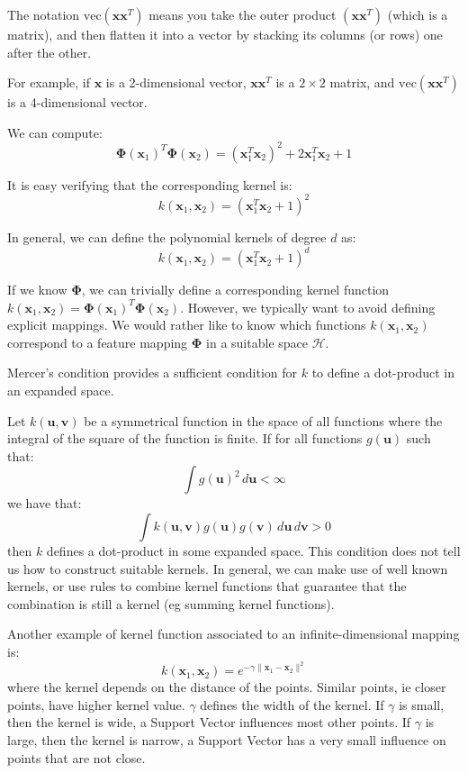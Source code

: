 The notation $\text{vec}(\mathbf{x}\mathbf{x}^T)$ means you take the outer product $(\mathbf{x}\mathbf{x}^T)$ (which is a matrix), and then
flatten it into a vector by stacking its columns (or rows) one after the other.

For example, if $\mathbf{x}$ is a 2-dimensional vector, $\mathbf{x}\mathbf{x}^T$ is a $2\times2$ matrix, and $\text{vec}(\mathbf{x}\mathbf{x}^T)$ is a
4-dimensional vector.

We can compute:
\[
\boldsymbol{\Phi}(\mathbf{x}_1)^T \boldsymbol{\Phi}(\mathbf{x}_2) = \left(\mathbf{x}_1^T \mathbf{x}_2\right)^2 + 2\mathbf{x}_1^T \mathbf{x}_2 + 1
\]

It is easy verifying that the corresponding kernel is:
\[
k(\mathbf{x}_1, \mathbf{x}_2) = \left(\mathbf{x}_1^T \mathbf{x}_2 + 1\right)^2
\]

In general, we can define the polynomial kernels of degree $d$ as:
\[
k(\mathbf{x}_1, \mathbf{x}_2) = \left(\mathbf{x}_1^T \mathbf{x}_2 + 1\right)^d
\]

If we know $\boldsymbol{\Phi}$, we can trivially define a corresponding kernel function $k(\mathbf{x}_1, \mathbf{x}_2) = \boldsymbol{\Phi}(\mathbf{x}_1)^T \boldsymbol{\Phi}(\mathbf{x}_2)$.
However, we typically want to avoid defining explicit mappings. We would rather like to
know which functions $k(\mathbf{x}_1, \mathbf{x}_2)$ correspond to a feature mapping $\boldsymbol{\Phi}$ in a suitable space
$\mathcal{H}$.

Mercer's condition provides a sufficient condition for $k$ to define a dot-product in an
expanded space.

Let $k(\mathbf{u}, \mathbf{v})$ be a symmetrical function in the space of all functions where the integral of the
square of the function is finite. If for all functions $g(\mathbf{u})$ such that:
\[
\int g(\mathbf{u})^2 \, d\mathbf{u} < \infty
\]
we have that:
\[
\int k(\mathbf{u}, \mathbf{v}) g(\mathbf{u}) g(\mathbf{v}) \, d\mathbf{u} \, d\mathbf{v} > 0
\]
then $k$ defines a dot-product in some expanded space. This condition does not tell us how
to construct suitable kernels. In general, we can make use of well known kernels, or use
rules to combine kernel functions that guarantee that the combination is still a kernel (eg
summing kernel functions).

Another example of kernel function associated to an infinite-dimensional mapping is:
\[
k(\mathbf{x}_1, \mathbf{x}_2) = e^{-\gamma\|\mathbf{x}_1 - \mathbf{x}_2\|^2}
\]
where the kernel depends on the distance of the points. Similar points, ie closer points,
have higher kernel value. $\gamma$ defines the width of the kernel. If $\gamma$ is small, then the kernel
is wide, a Support Vector influences most other points. If $\gamma$ is large, then the kernel is
narrow, a Support Vector has a very small influence on points that are not close.

